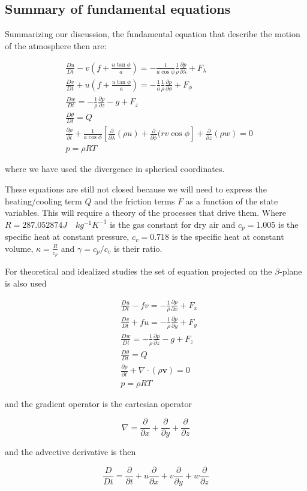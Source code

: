 \subsection{Summary of fundamental
equations}\label{summary-of-fundamental-equations}

Summarizing our discussion, the fundamental equation that describe the
motion of the atmosphere then are:

\[\begin{aligned}
&\frac{D u}{Dt} - v\left(f +  \frac{u \tan{\phi}}{a}\right)  = -\frac{1}{ a \cos{\phi}}\frac{1}{\rho}\frac{\partial p}{\partial \lambda}   + F_\lambda \\
&\frac{D v}{Dt} + u\left( f + \frac{u \tan{\phi}}{a}\right)  = -\frac{1}{a}\frac{1}{\rho}\frac{\partial p}{\partial \phi}  + F_\phi \\
&\frac{D w}{Dt}  = -\frac{1}{\rho }\frac{\partial p}{\partial z} -g  + F_z \label{Eq:PrimEq}\\
&\frac{D \theta}{Dt} = Q \\
&\frac{\partial \rho}{\partial t}+\frac{1}{a\cos{\phi}}\left[ \frac{\partial }{\partial \lambda}(\rho u) + \frac{\partial }{\partial \phi}(rv\cos{\phi} \right] +\frac{\partial }{\partial z}(\rho w) = 0 \\
&p = \rho R T
\end{aligned}\]

where we have used the divergence in spherical coordinates.

These equations are still not closed because we will need to express the
heating/cooling term \(Q\) and the friction terms \(F\) as a function of
the state variables. This will require a theory of the processes that
drive them. Where \(R=287.052874 J \quad kg^{-1} K^{-1}\) is the gas
constant for dry air and \(c_p = 1.005\) is the specific heat at
constant pressure, \(c_v = 0.718\) is the specific heat at constant
volume, \(\kappa = \frac{R}{c_p}\) and \(\gamma=c_p/c_v\) is their
ratio.

For theoretical and idealized studies the set of equation projected on
the \(\beta\)-plane is also used

\[\begin{aligned}
&\frac{D u}{Dt} - fv  = -\frac{1}{\rho}\frac{\partial p}{\partial x}   + F_x \\
&\frac{D v}{Dt} + fu = -\frac{1}{\rho}\frac{\partial p}{\partial y}  + F_y \\
&\frac{D w}{Dt}  = -\frac{1}{\rho }\frac{\partial p}{\partial z} -g  + F_z \\
&\frac{D \theta}{Dt} = Q\\
&\frac{\partial \rho}{\partial t}+\nabla\cdot(\rho\mathbf{v}) = 0\\
&p = \rho R T
\end{aligned}\]

and the gradient operator is the cartesian operator

\[\nabla = \frac{\partial }{\partial x} + \frac{\partial }{\partial y} + \frac{\partial }{\partial z}\]

and the advective derivative is then

\[\frac{D }{Dt} = \frac{\partial }{\partial t} + u\frac{\partial }{\partial x} + v\frac{\partial }{\partial y} + w\frac{\partial }{\partial z}\]
